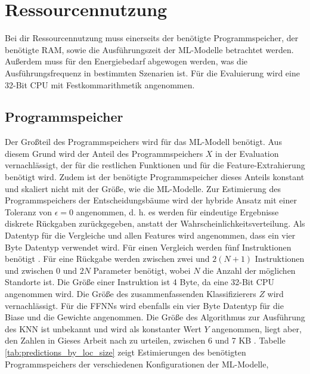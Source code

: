 \section{Ressourcennutzung}
Bei dir Ressourcennutzung muss einerseits der benötigte Programmspeicher, der benötigte RAM, sowie die Ausführungszeit der ML-Modelle betrachtet werden.
Außerdem muss für den Energiebedarf abgewogen werden, was die Ausführungsfrequenz in bestimmten Szenarien ist.
\newline
\newline
Für die Evaluierung wird eine 32-Bit CPU mit Festkommarithmetik angenommen.

\subsection{Programmspeicher}
Der Großteil des Programmspeichers wird für das ML-Modell benötigt.
Aus diesem Grund wird der Anteil des Programmspeichers $X$ in der Evaluation vernachlässigt,
der für die restlichen Funktionen und für die Feature-Extrahierung benötigt wird.
Zudem ist der benötigte Programmspeicher dieses Anteils konstant und skaliert nicht mit der Größe, wie die ML-Modelle.
\newline
\newline
Zur Estimierung des Programmspeichers der Entscheidungsbäume wird der hybride Ansatz mit einer Toleranz von $\epsilon=0$ angenommen,
d. h. es werden für eindeutige Ergebnisse diskrete Rückgaben zurückgegeben, anstatt der Wahrscheinlichkeitsverteilung.
Als Datentyp für die Vergleiche und allen Features wird angenommen, dass ein vier Byte Datentyp verwendet wird.
Für einen Vergleich werden fünf Instruktionen benötigt \cite{dymelThesis}.
Für eine Rückgabe werden zwischen zwei und $2(N+1)$ Instruktionen und zwischen 0 und $2N$ Parameter benötigt,
wobei $N$ die Anzahl der möglichen Standorte ist.
Die Größe einer Instruktion ist 4 Byte, da eine 32-Bit CPU angenommen wird.
Die Größe des zusammenfassenden Klassifizierers $Z$ wird vernachlässigt.
\newline
\newline
Für die FFNNs wird ebenfalls ein vier Byte Datentyp für die Biase und die Gewichte angenommen.
Die Größe des Algorithmus zur Ausführung des KNN ist unbekannt und wird als konstanter Wert $Y$ angenommen,
liegt aber, den Zahlen in Gieses Arbeit nach zu urteilen, zwischen 6 und 7 KB \cite{gieseThesis}.
\newline
\newline
Tabelle \ref{tab:predictions_by_loc_size} zeigt Estimierungen des benötigten Programmspeichers der verschiedenen Konfigurationen der ML-Modelle,
